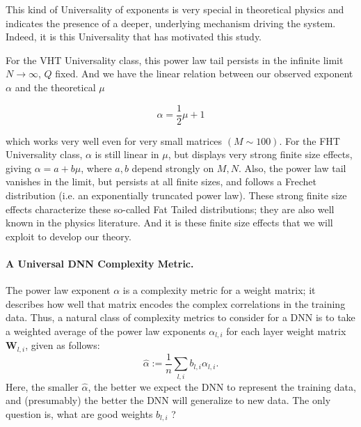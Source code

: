 This kind of Universality of exponents is very special in theoretical physics and indicates the presence of a deeper, 
underlying mechanism driving the system.  Indeed, it is this Universality that has motivated this study.


For the VHT Universality class, this power law tail persists in the infinite limit $N\rightarrow\infty$, $Q$ fixed.
And we have the linear relation between our observed exponent $\alpha$ and the theoretical $\mu$

$$\alpha=\dfrac{1}{2}\mu+1$$

which works very well even for very small matrices $(M\sim100)$.
For the FHT Universality class, $\alpha$ is still linear in $\mu$, but displays very strong finite size effects, giving $\alpha=a+b\mu$, where $a,b$ depend strongly on $M,N$. Also,  the power law tail vanishes in the limit, but persists at all finite sizes, and follows a Frechet distribution (i.e. an exponentially truncated power law). 
These strong finite size effects characterize these so-called Fat Tailed distributions; they are also well known in the physics literature\cite{SornetteBook,BouchaudPotters03}. 
And it is these finite size effects that we will exploit to develop our theory.


\paragraph{A Universal DNN Complexity Metric.} 

The power law exponent $\alpha$ is a complexity metric for a weight matrix; it describes how well that matrix encodes the complex correlations in the training data.
Thus, a natural class of complexity metrics to consider for a DNN is to take a weighted average of the power law exponents $\alpha_{l,i}$ for each layer weight matrix $\mathbf{W}_{l,i}$, given as follows:
\begin{equation}
\hat{\alpha}:=\dfrac{1}{n}\sum_{l,i}b_{l,i}\alpha_{l,i}  .
\label{eqn:alpha_hat_generic}
\end{equation}
Here, the smaller $\hat{\alpha}$, the better we expect the DNN to represent the training data, and (presumably) the better the DNN will generalize to new data.
The only question is, what are good weights $b_{l,i}$ ?

